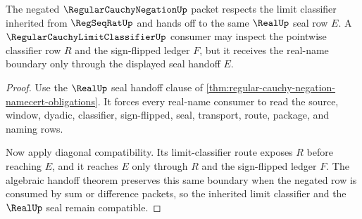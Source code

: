 \begin{theorem}
\label{thm:regular-cauchy-negation-limit-classifier-compatibility}
The negated $\RegularCauchyNegationUp$ packet respects the limit classifier inherited from $\RegSeqRatUp$ and hands off to the same $\RealUp$ seal row $E$. A $\RegularCauchyLimitClassifierUp$ consumer may inspect the pointwise classifier row $R$ and the sign-flipped ledger $F$, but it receives the real-name boundary only through the displayed seal handoff $E$.
\end{theorem}
\begin{proof}
Use the $\RealUp$ seal handoff clause of \autoref{thm:regular-cauchy-negation-namecert-obligations}. It forces every real-name consumer to read the source, window, dyadic, classifier, sign-flipped, seal, transport, route, package, and naming rows.

Now apply diagonal compatibility. Its limit-classifier route exposes $R$ before reaching $E$, and it reaches $E$ only through $R$ and the sign-flipped ledger $F$. The algebraic handoff theorem preserves this same boundary when the negated row is consumed by sum or difference packets, so the inherited limit classifier and the $\RealUp$ seal remain compatible.
\end{proof}

